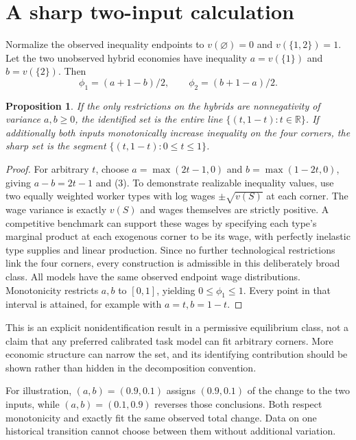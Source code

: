 \documentclass[11pt]{article}
\newtheorem{proposition}[theorem]{Proposition}
\theoremstyle{definition}
\newcommand{\R}{\mathbb R}
\begin{document}
\section*{A sharp two-input calculation}
Normalize the observed inequality endpoints to $v(\varnothing)=0$ and
$v(\{1,2\})=1$. Let the two unobserved hybrid economies have inequality
$a=v(\{1\})$ and $b=v(\{2\})$. Then
\[
 \phi_1=(a+1-b)/2,\qquad \phi_2=(b+1-a)/2.               \tag{3}
\]
\begin{proposition}
If the only restrictions on the hybrids are nonnegativity of variance
$a,b\ge0$, the identified set is the entire line
$\{(t,1-t):t\in\R\}$. If additionally both inputs monotonically increase
inequality on the four corners, the sharp set is the segment
$\{(t,1-t):0\le t\le1\}$.
\end{proposition}
\begin{proof}
For arbitrary $t$, choose $a=\max(2t-1,0)$ and
$b=\max(1-2t,0)$, giving $a-b=2t-1$ and (3).
To demonstrate realizable inequality values, use two equally weighted worker
types with log wages $\pm\sqrt{v(S)}$ at each corner. The wage variance is
exactly $v(S)$ and wages themselves are strictly positive. A competitive
benchmark can support these wages by specifying each type's marginal product
at each exogenous corner to be its wage, with perfectly inelastic type supplies
and linear production. Since no further technological restrictions link the
four corners, every construction is admissible in this deliberately broad
class. All models have the same observed endpoint wage distributions.
Monotonicity restricts $a,b$ to $[0,1]$, yielding $0\le\phi_1\le1$.
Every point in that interval is attained, for example with $a=t,b=1-t$.
\end{proof}
This is an explicit nonidentification result in a permissive equilibrium class,
not a claim that any preferred calibrated task model can fit arbitrary corners.
More economic structure can narrow the set, and its identifying contribution
should be shown rather than hidden in the decomposition convention.

For illustration, $(a,b)=(0.9,0.1)$ assigns $(0.9,0.1)$ of the change to
the two inputs, while $(a,b)=(0.1,0.9)$ reverses those conclusions. Both respect
monotonicity and exactly fit the same observed total change. Data on one
historical transition cannot choose between them without additional variation.
\end{document}

